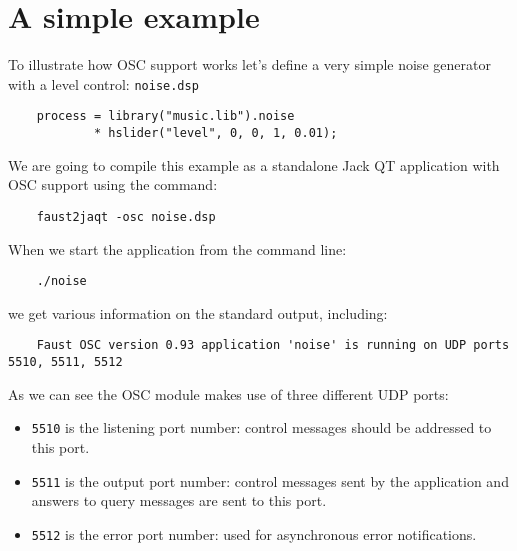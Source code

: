 \section{A simple example}

To illustrate how OSC support works let's define a very simple noise generator with a level control: \lstinline'noise.dsp'
\begin{lstlisting}
	process = library("music.lib").noise 
	        * hslider("level", 0, 0, 1, 0.01);
\end{lstlisting}
	
We are going to compile this example as a standalone Jack QT application with OSC support using the command:
\begin{lstlisting}
	faust2jaqt -osc noise.dsp
\end{lstlisting}

When we start the application from the command line:
\begin{lstlisting}
	./noise 
\end{lstlisting}
we get various information on the standard output, including:
\begin{lstlisting}
	Faust OSC version 0.93 application 'noise' is running on UDP ports 5510, 5511, 5512
\end{lstlisting}
As we can see the OSC module makes use of three different UDP ports:
\begin{itemize}
\item \lstinline'5510' is the listening port number: control messages should be addressed to this port.
\item \lstinline'5511' is the output port number: control messages sent by the application and answers to query messages are sent to this port.
\item \lstinline'5512' is the error port number: used for asynchronous error notifications.
\end{itemize}


